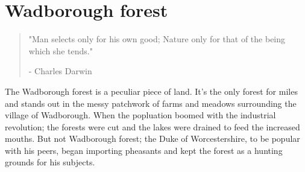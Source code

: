 \documentclass[smalldemyvopaper,11pt,twoside,onecolumn,openright,extrafontsizes]{memoir}
\renewcommand*{\thepage}{\footnotesize\babylonian{page}}
\begin{document}








\mainmatter
\chapter{Wadborough forest}
\vspace{-1.3cm}
\begin{localsize}{10}
	\begin{quote}
		"Man selects only for his own good; Nature only for that of the being which she tends."
		\begin{flushright}- Charles Darwin\end{flushright}
	\end{quote} 
\end{localsize}
\vspace{1cm}


The Wadborough forest is a peculiar piece of land. It's the only forest for miles and stands out in the messy patchwork of farms and meadows surrounding the village of Wadborough. When the popluation boomed with the industrial revolution; the forests were cut and the lakes were drained to feed the increased mouths. But not Wadborough forest; the Duke of Worcestershire, to be popular with his peers, began importing pheasants and kept the forest as a hunting grounds for his subjects.\\
 
\end{document}

